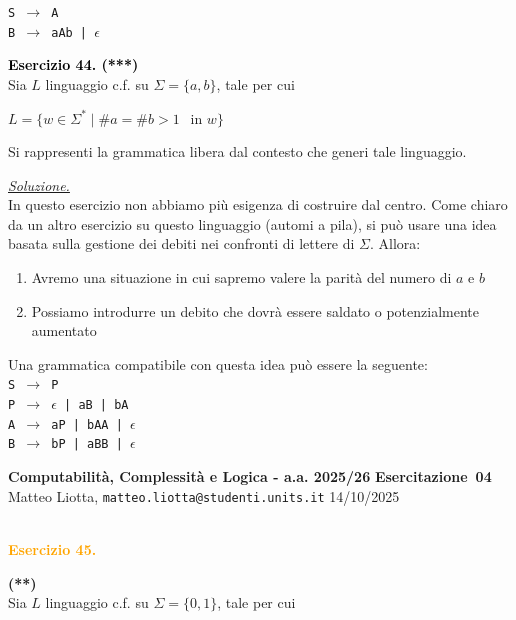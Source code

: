 \documentclass[a4paper,10pt]{article}
\makeatletter
\newcommand{\EsercitazioneNum}{04}
\newcommand{\Data}{14/10/2025}
\newcommand{\DocType}{Esercitazione} %
\newcommand{\FullTitle}{\DocType\ \EsercitazioneNum}
\newcommand{\Header}{
\noindent
  \small \textbf{Computabilità, Complessità e Logica - a.a. 2025/26} \hfill \textbf{\FullTitle} \\[0.2cm]
  \scriptsize Matteo Liotta, \texttt{matteo.liotta@studenti.units.it} \hfill \Data \\[0.2cm]
  \noindent\makebox[\linewidth]{\rule{\linewidth}{0.4pt}} \\[0.3cm]}
\newcommand{\NewPageHeader}{
  \vfill
  \noindent\makebox[\linewidth]{\rule{\linewidth}{0.4pt}}
  \newpage
  {\Header}
}
\makeatother
\begin{document}
{\begin{itemize}[label=, leftmargin=0pt]
\begin{osservazioni}
    \texttt{S $\rightarrow$ A}\\
    \texttt{B $\rightarrow$ aAb  | $\epsilon$}
    \end{osservazioni}

    \item \textcolor{black}{\textbf{Esercizio 44. (***)}\\ }
    Sia $L$ linguaggio c.f. su $\Sigma=\{a,b\}$, tale per cui 
    {\begin{center}
        $L = \{ w\in \Sigma^* \mid \#a = \#b >1\ \  \text{\ in\ }w \}$\\
    \end{center}} 
    Si rappresenti la grammatica libera dal contesto che generi tale linguaggio.

    
    \begin{osservazioni}
    \underline{\textit{Soluzione.}} \\
    In questo esercizio non abbiamo più esigenza di costruire dal centro. Come chiaro da un altro esercizio su questo linguaggio (automi a pila), si può usare una idea basata sulla gestione dei debiti nei confronti di lettere di $\Sigma$. 
    Allora:
    \begin{enumerate}
        \item Avremo una situazione in cui sapremo valere la parità del numero di $a$ e $b$
        \item Possiamo introdurre un debito che dovrà essere saldato o potenzialmente aumentato
    \end{enumerate}
    
    Una grammatica compatibile con questa idea può essere la seguente:\\
    
    \texttt{S $\rightarrow$ P}\\
    \texttt{P $\rightarrow$ $\epsilon$ | aB | bA}\\
    \texttt{A $\rightarrow$ aP | bAA | $\epsilon$}\\
    \texttt{B $\rightarrow$ bP | aBB | $\epsilon$}
    
    
    \end{osservazioni}

    \NewPageHeader

    \textcolor{orange}{\item \textbf{Esercizio 45. }}\textbf{(**)}\\ 
    Sia $L$ linguaggio c.f. su $\Sigma=\{0,1\}$, tale per cui 


\end{itemize}}
\end{document}
